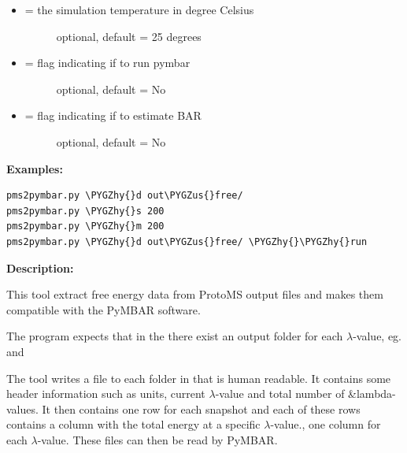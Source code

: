 \documentclass[letterpaper,10pt,english]{sphinxmanual}
\def\PYGZus{\char`\_}
\def\PYGZhy{\char`\-}
\begin{document}
\begin{itemize}
\begin{description}
\end{description}

\item {} \begin{description}
\item[{ = the simulation temperature in degree Celsius}] \leavevmode
optional, default = 25 degrees

\end{description}

\item {} \begin{description}
\item[{ = flag indicating if to run pymbar}] \leavevmode
optional, default = No

\end{description}

\item {} \begin{description}
\item[{ = flag indicating if to estimate BAR}] \leavevmode
optional, default = No

\end{description}

\end{itemize}

\textbf{Examples:}

\begin{Verbatim}[commandchars=\\\{\}]
pms2pymbar.py \PYGZhy{}d out\PYGZus{}free/
pms2pymbar.py \PYGZhy{}s 200
pms2pymbar.py \PYGZhy{}m 200
pms2pymbar.py \PYGZhy{}d out\PYGZus{}free/ \PYGZhy{}\PYGZhy{}run
\end{Verbatim}

\textbf{Description:}

This tool extract free energy data from ProtoMS output files and makes them compatible with the PyMBAR software.

The program expects that in the  there exist an output folder for each \(\lambda\)-value, eg.  and 

The tool writes a file  to each folder in  that is human readable. It contains some header information such as units, current \(\lambda\)-value and total number of \&lambda-values. It then contains one row for each snapshot and each of these rows contains a column with the total energy at a specific \(\lambda\)-value., one column for each \(\lambda\)-value. These files can then be read by PyMBAR.
\end{document}
